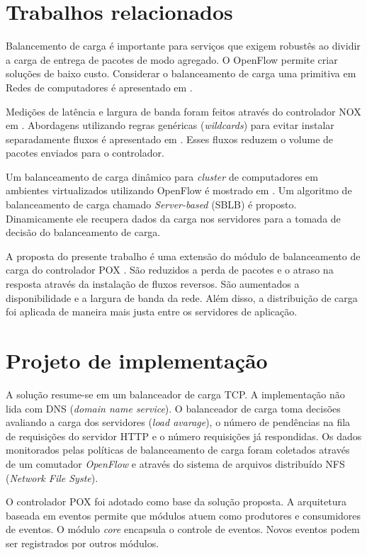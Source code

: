 \section{Trabalhos relacionados}

Balancemento de carga é importante para serviços que exigem robustês ao dividir
a carga de entrega de pacotes de modo agregado.
O OpenFlow permite criar soluções de baixo custo.
Considerar o balanceamento de carga uma primitiva em Redes de computadores é 
apresentado em \cite{nikhil2010asterix}.

Medições de latência e largura de banda foram feitos através do controlador
NOX em \cite{hardeep2010openflow}.
Abordagens utilizando regras genéricas (\emph{wildcards}) para evitar instalar
separadamente fluxos é apresentado em \cite{richard2011openflow}. 
Esses fluxos reduzem o volume de pacotes enviados para o controlador.

Um balanceamento de carga dinâmico para \emph{cluster} de computadores em 
ambientes virtualizados utilizando OpenFlow é mostrado em 
\citep{chen2014design}.
Um algoritmo de balanceamento de carga chamado \emph{Server-based} (SBLB) 
é proposto. 
Dinamicamente ele recupera dados da carga nos servidores para a tomada de 
decisão do balanceamento de carga. 

A proposta do presente trabalho é uma extensão do módulo de balanceamento
de carga do controlador POX \citep{pox2015}.
São reduzidos a perda de pacotes e o atraso na resposta através da instalação
de fluxos reversos. 
São aumentados a disponibilidade e a largura de banda da rede.
Além disso, a distribuição de carga foi aplicada de maneira mais justa entre
os servidores de aplicação.


\section{Projeto de implementação}

A solução resume-se em um balanceador de carga TCP.
A implementação não lida com DNS (\emph{domain name service}).
O balanceador de carga toma decisões avaliando a carga dos servidores
(\emph{load avarage}), o número de pendências na fila de requisições do 
servidor HTTP e o número requisições já respondidas.
Os dados monitorados pelas políticas de balanceamento de carga foram coletados
através de um comutador \emph{OpenFlow} e através do sistema de arquivos 
distribuído NFS (\emph{Network File Syste}).

O controlador POX \citep{pox2015} foi adotado como base da solução proposta.
A arquitetura baseada em eventos permite que módulos atuem como produtores
e consumidores de eventos.
O módulo \emph{core} encapsula o controle de eventos.
Novos eventos podem ser registrados por outros módulos.

